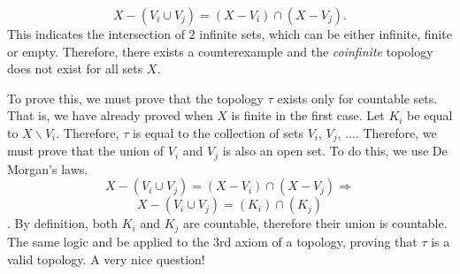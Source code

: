 \documentclass{report}
\begin{document}
                    \[
                        X - ( V_i \cup V_j ) = (X - V_i) \cap (X - V_j).                  
                    \]
This indicates the intersection of $2$ infinite sets, which can be either infinite, finite or empty. Therefore, there exists a counterexample and the \textit{coinfinite} topology does not exist for all sets $X$. 

\qs{1.5.c}{The \textit{cocountable} topology: A set $V \subseteq X$ is open iff \[ [X \backslash V \text{ is countable or  } V = \phi.\]} 
\sol To prove this, we must prove that the topology $\tau$ exists only for countable sets. That is, we have already proved when $X$ is finite in the first case. Let $K_i$ be equal to $X \backslash V_i$. Therefore, $\tau$ is equal to the collection of sets $V_i$, $V_j$, $\dots$. Therefore, we must prove that the union of $V_i$ and $V_j$ is also an open set. To do this, we use De Morgan's laws.
                    \[X - (V_i \cup V_j) = (X-V_i) \cap (X-V_j) \Longrightarrow  \]
                    \[X - (V_i \cup V_j) = (K_i) \cap (K_j) \].
By definition, both $K_i$ and $K_j$ are countable, therefore their union is countable. The same logic and be applied to the $3$rd axiom of a topology, proving that $\tau$ is a valid topology. A very nice question!                            
\end{document}
